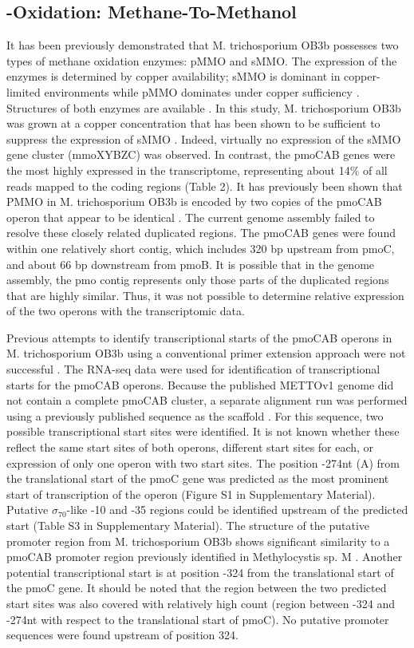 \subsection{-Oxidation: Methane-To-Methanol}
It has been previously demonstrated that M. trichosporium OB3b possesses two types of methane oxidation enzymes: pMMO and sMMO.
The expression of the enzymes is determined by copper availability; sMMO is dominant in copper-limited environments while pMMO dominates under copper sufficiency \cite{hakemian2007, semrau2010}.
Structures of both enzymes are available \cite{elango1997, hakemian2008}.
In this study, M. trichosporium OB3b was grown at a copper concentration that has been shown to be sufficient to suppress the expression of sMMO \cite{park1991, phelps1992, nielsen1997, lloyd1999, murrell2000}.
Indeed, virtually no expression of the sMMO gene cluster (mmoXYBZC) was observed.
In contrast, the pmoCAB genes were the most highly expressed in the transcriptome, representing about 14\% of all reads mapped to the coding regions (Table 2).
It has previously been shown that PMMO in M. trichosporium OB3b is encoded by two copies of the pmoCAB operon that appear to be identical \cite{gilbert2000}.
The current genome assembly failed to resolve these closely related duplicated regions.
The pmoCAB genes were found within one relatively short contig, which includes 320 bp upstream from pmoC, and about 66 bp downstream from pmoB.
It is possible that in the genome assembly, the pmo contig represents only those parts of the duplicated regions that are highly similar.
Thus, it was not possible to determine relative expression of the two operons with the transcriptomic data.

Previous attempts to identify transcriptional starts of the pmoCAB operons in M. trichosporium OB3b using a conventional primer extension approach were not successful \cite{gilbert2000}.
The RNA-seq data were used for identification of transcriptional starts for the pmoCAB operons.
Because the published METTOv1 genome did not contain a complete pmoCAB cluster, a separate alignment run was performed using a previously published sequence as the scaffold \cite{holmes1995}.
For this sequence, two possible transcriptional start sites were identified.
It is not known whether these reflect the same start sites of both operons, different start sites for each, or expression of only one operon with two start sites.
The position -274nt (A) from the translational start of the pmoC gene was predicted as the most prominent start of transcription of the operon (Figure S1 in Supplementary Material).
Putative $\sigma_{70}$-like -10 and -35 regions could be identified upstream of the predicted start (Table S3 in Supplementary Material).
The structure of the putative promoter region from M. trichosporium OB3b shows significant similarity to a pmoCAB promoter region previously identified in Methylocystis sp. M \cite{gilbert2000}.
Another potential transcriptional start is at position -324 from the translational start of the pmoC gene.
It should be noted that the region between the two predicted start sites was also covered with relatively high count (region between -324 and -274nt with respect to the translational start of pmoC).
No putative promoter sequences were found upstream of position 324.

